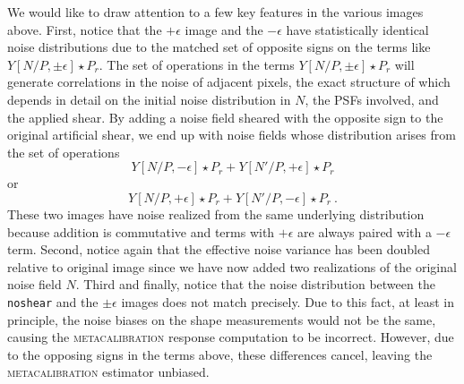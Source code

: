 \documentclass[twocolumn]{openjournal}
\makeatletter
\newcommand{\mcal}{\textsc{metacalibration}\@\xspace}
\newcommand{\noshear}{\texttt{noshear}\@\xspace}
\makeatother
\begin{document}
We would like to draw attention to a few key features in the various images above. First, notice that
the $+\epsilon$ image and the $-\epsilon$ have statistically identical noise
distributions due to the matched set of opposite signs on the terms like
$Y[N/P,\pm\epsilon] \star P_r$. The set of operations in the terms
$Y[N/P,\pm\epsilon] \star P_r$  will generate correlations in the noise of adjacent
pixels, the exact structure of which depends in  detail on the initial noise
distribution in $N$, the PSFs involved, and the applied shear. By adding a noise field
sheared with the opposite sign to the original artificial shear, we end up with noise
fields whose distribution arises from the set of operations
\begin{equation*}
Y[N/P, -\epsilon] \star P_r + Y[N'/P, +\epsilon] \star P_r
\end{equation*}
or
\begin{equation*}
Y[N/P, +\epsilon] \star P_r + Y[N'/P, -\epsilon] \star P_r\ .
\end{equation*}
These two images have noise realized from the same underlying distribution because
addition is commutative and terms with $+\epsilon$ are always paired with a $-\epsilon$
term. Second, notice again that the effective noise variance has been doubled relative
to original image since we have now added two realizations of the original noise field
$N$. Third and finally, notice that the noise distribution between the \noshear and the
$\pm\epsilon$ images does not match precisely. Due to this fact, at least in principle,
the noise biases on the shape measurements would not be the same, causing the \mcal
response computation to be incorrect. However, due to the opposing signs in the terms
above, these differences cancel, leaving the \mcal estimator unbiased.
\end{document}
